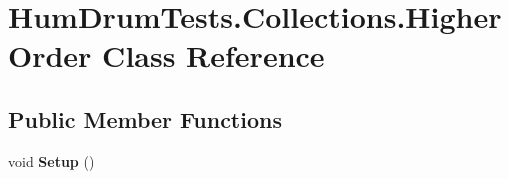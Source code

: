 \hypertarget{classHumDrumTests_1_1Collections_1_1HigherOrder}{}\section{Hum\+Drum\+Tests.\+Collections.\+Higher\+Order Class Reference}
\label{classHumDrumTests_1_1Collections_1_1HigherOrder}
\subsection*{Public Member Functions}
\begin{DoxyCompactItemize}
\item 
\hypertarget{classHumDrumTests_1_1Collections_1_1HigherOrder_ac1ca02135dac3cd5e3d6b99cf932e27d}{}void {\bfseries Setup} ()\label{classHumDrumTests_1_1Collections_1_1HigherOrder_ac1ca02135dac3cd5e3d6b99cf932e27d}


\end{DoxyCompactItemize}

